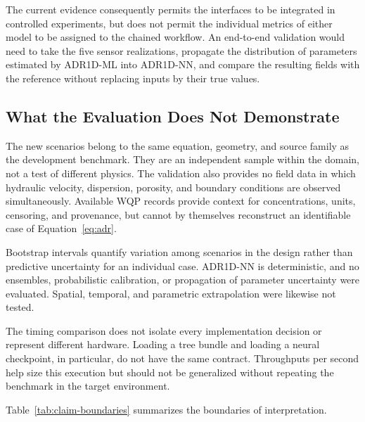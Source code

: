 \documentclass[11pt,a4paper]{article}
\begin{document}
The current evidence consequently permits the interfaces to be integrated in
controlled experiments, but does not permit the individual metrics of either
model to be assigned to the chained workflow. An end-to-end validation would
need to take the five sensor realizations, propagate the distribution of
parameters estimated by ADR1D-ML into ADR1D-NN, and compare the resulting
fields with the reference without replacing inputs by their true values.

\subsection{What the Evaluation Does Not Demonstrate}

The new scenarios belong to the same equation, geometry, and source family as
the development benchmark. They are an independent sample within the domain,
not a test of different physics. The validation also provides no field data in
which hydraulic velocity, dispersion, porosity, and boundary conditions are
observed simultaneously. Available WQP records provide context for
concentrations, units, censoring, and provenance, but cannot by themselves
reconstruct an identifiable case of Equation~\eqref{eq:adr}.

Bootstrap intervals quantify variation among scenarios in the design rather
than predictive uncertainty for an individual case. ADR1D-NN is deterministic,
and no ensembles, probabilistic calibration, or propagation of parameter
uncertainty were evaluated. Spatial, temporal, and parametric extrapolation
were likewise not tested.

The timing comparison does not isolate every implementation decision or
represent different hardware. Loading a tree bundle and loading a neural
checkpoint, in particular, do not have the same contract. Throughputs per
second help size this execution but should not be generalized without repeating
the benchmark in the target environment.

Table~\ref{tab:claim-boundaries} summarizes the boundaries of interpretation.
\end{document}
